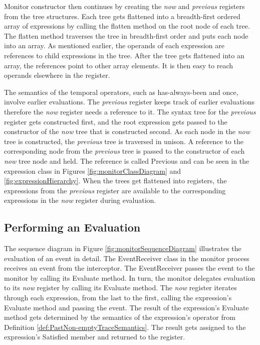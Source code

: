 Monitor constructor then continues by creating the \textit{now} and \textit{previous} registers from the tree structures.  Each tree gets flattened into a breadth-first ordered array of expressions by calling the flatten method on the root node of each tree.  The flatten method traverses the tree in breadth-first order and puts each node into an array.  As mentioned earlier, the operands of each expression are references to child expressions in the tree.  After the tree gets flattened into an array, the references point to other array elements.  It is then easy to reach operands elsewhere in the register.

The semantics of the temporal operators, such as has-always-been and once, involve earlier evaluations.  The \textit{previous} register keeps track of earlier evaluations therefore the \textit{now} register needs a reference to it.  The syntax tree for the \textit{previous} register gets constructed first, and the root expression gets passed to the constructor of the \textit{now} tree that is constructed second.  As each node in the \textit{now} tree is constructed, the \textit{previous} tree is traversed in unison.  A reference to the corresponding node from the \textit{previous} tree is passed to the constructor of each \textit{now} tree node and held.  The reference is called Previous and can be seen in the expression class in Figures \ref{fig:monitorClassDiagram} and \ref{fig:expressionHierarchy}.  When the trees get flattened into registers, the expressions from the \textit{previous} register are available to the corresponding expressions in the \textit{now} register during evaluation.

\subsection{Performing an Evaluation}
\label{sec:PerformingAnEvaluation}

The sequence diagram in Figure \ref{fig:monitorSequenceDiagram} illustrates the evaluation of an event in detail.  The EventReceiver class in the monitor process receives an event from the interceptor.  The EventReceiver passes the event to the monitor by calling its Evaluate method.  In turn, the monitor delegates evaluation to its \textit{now} register by calling its Evaluate method.  The \textit{now} register iterates through each expression, from the last to the first, calling the expression's Evaluate method and passing the event.  The result of the expression's Evaluate method gets determined by the semantics of the expression's operator from Definition \ref{def:PastNon-emptyTraceSemantics}.  The result gets assigned to the expression's Satisfied member and returned to the register.

